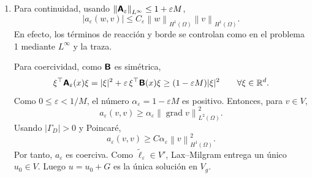 \documentclass[11pt]{article}
\newcommand{\norm}[1]{\left\lVert #1\right\rVert}
\newcommand{\abs}[1]{\left|#1\right|}
\def\mat   #1{\mbox{\boldmath $\mathsf #1$}}
\DeclareMathOperator{\grad}{grad}
\def\R{\mathbb R}
\begin{document}
\begin{enumerate}[label=\textbf{\arabic*.}, leftmargin=*]
\begin{enumerate}[label=(\alph*)]
        \item Para continuidad, usando $\norm{\mat A_\varepsilon}_{L^\infty}\le 1+\varepsilon M$,
        \[
            \abs{a_\varepsilon(w,v)}
            \le
            C_\varepsilon\norm{w}_{H^1(\Omega)}\norm{v}_{H^1(\Omega)}.
        \]
        En efecto, los términos de reacción y borde se controlan como en el problema 1 mediante $L^\infty$ y la traza.

        Para coercividad, como $\mat B$ es simétrica,
        \[
            \xi^\top\mat A_\varepsilon(x)\xi
            =
            |\xi|^2+\varepsilon\,\xi^\top\mat B(x)\xi
            \ge
            (1-\varepsilon M)|\xi|^2
            \qquad\forall \xi\in\R^d.
        \]
        Como $0\le\varepsilon<1/M$, el número $\alpha_\varepsilon=1-\varepsilon M$ es positivo. Entonces, para $v\in V$,
        \[
            a_\varepsilon(v,v)
            \ge
            \alpha_\varepsilon\norm{\grad v}_{L^2(\Omega)}^2.
        \]
        Usando $|\Gamma_D|>0$ y Poincaré,
        \[
            a_\varepsilon(v,v)
            \ge
            C\alpha_\varepsilon\norm{v}_{H^1(\Omega)}^2.
        \]
        Por tanto, $a_\varepsilon$ es coerciva. Como $\widetilde\ell_\varepsilon\in V'$, Lax--Milgram entrega un único $u_0\in V$. Luego $u=u_0+G$ es la única solución en $V_g$.


\end{enumerate}
\end{enumerate}
\end{document}
